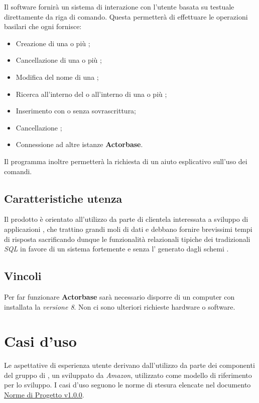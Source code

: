 \documentclass{scalatekids-article}
\begin{document}
Il software fornirà un sistema di interazione con l'utente basata su 
testuale direttamente da riga di comando. Questa permetterà di effettuare le operazioni
basilari che ogni  fornisce:
\begin{itemize}
\item Creazione di una o più ;
\item Cancellazione di una o più ;
\item Modifica del nome di una ;
\item Ricerca all'interno del  o all'interno di una o più ;
\item Inserimento  con o senza sovrascrittura;
\item Cancellazione ;
\item Connessione ad altre istanze \textbf{Actorbase}.
\end{itemize}
Il programma inoltre permetterà la richiesta di un aiuto esplicativo sull'uso
dei comandi.

\subsection{Caratteristiche utenza}

Il prodotto è orientato all'utilizzo da parte di clientela interessata a
sviluppo di applicazioni , che trattino grandi moli di dati e
debbano fornire brevissimi tempi di risposta sacrificando dunque le
funzionalità relazionali tipiche dei tradizionali  \textit{SQL} in
favore di un sistema fortemente  e senza l' generato
dagli schemi .

\subsection{Vincoli}

Per far funzionare \textbf{Actorbase} sarà necessario disporre di un computer con
installata la \textit{ versione 8}. Non ci sono ulteriori richieste hardware o software.

\section{Casi d'uso}

Le aspettative di esperienza utente derivano dall'utilizzo da parte dei
componenti del gruppo di , un  
sviluppato da \textit{Amazon}, utilizzato come modello di riferimento per lo sviluppo. I casi d'uso seguono le norme di stesura elencate nel documento \href{run:../Interni/NormeDiProgetto\_v1.0.0.pdf}{Norme di Progetto v1.0.0}.
\end{document}
